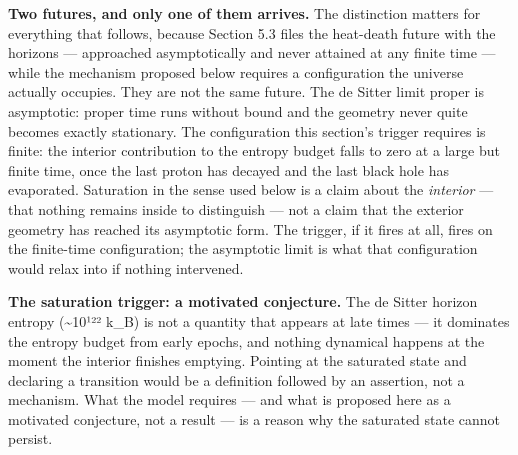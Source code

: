 \documentclass[
]{article}
\begin{document}
\textbf{Two futures, and only one of them arrives.} The distinction
matters for everything that follows, because Section 5.3 files the
heat-death future with the horizons --- approached asymptotically and
never attained at any finite time --- while the mechanism proposed below
requires a configuration the universe actually occupies. They are not
the same future. The de Sitter limit proper is asymptotic: proper time
runs without bound and the geometry never quite becomes exactly
stationary. The configuration this section's trigger requires is finite:
the interior contribution to the entropy budget falls to zero at a large
but finite time, once the last proton has decayed and the last black
hole has evaporated. Saturation in the sense used below is a claim about
the \emph{interior} --- that nothing remains inside to distinguish ---
not a claim that the exterior geometry has reached its asymptotic form.
The trigger, if it fires at all, fires on the finite-time configuration;
the asymptotic limit is what that configuration would relax into if
nothing intervened.

\textbf{The saturation trigger: a motivated conjecture.} The de Sitter
horizon entropy (\textasciitilde10¹²² k\_B) is not a quantity that
appears at late times --- it dominates the entropy budget from early
epochs, and nothing dynamical happens at the moment the interior
finishes emptying. Pointing at the saturated state and declaring a
transition would be a definition followed by an assertion, not a
mechanism. What the model requires --- and what is proposed here as a
motivated conjecture, not a result --- is a reason why the saturated
state cannot persist.
\end{document}
